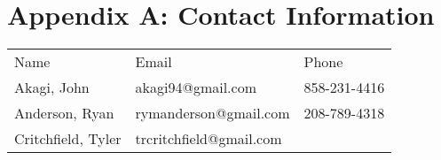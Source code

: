 \hypertarget{h.y4whnbg7qmd5}{\section{\texorpdfstring{{Appendix A:
Contact
Information}}{Appendix A: Contact Information}}\label{h.y4whnbg7qmd5}}

{}

\protect\hypertarget{t.2e2042f591def9aa75055b0ca485dff6c63ddda4}{}{}\protect\hypertarget{t.0}{}{}

\begin{longtable}[]{@{}lll@{}}
\toprule
\begin{minipage}[t]{0.30\columnwidth}\raggedright\strut
{Name}\strut
\end{minipage} & \begin{minipage}[t]{0.30\columnwidth}\raggedright\strut
{Email}\strut
\end{minipage} & \begin{minipage}[t]{0.30\columnwidth}\raggedright\strut
{Phone}\strut
\end{minipage}\tabularnewline
\begin{minipage}[t]{0.30\columnwidth}\raggedright\strut
{Akagi, John}\strut
\end{minipage} & \begin{minipage}[t]{0.30\columnwidth}\raggedright\strut
{akagi94@gmail.com}\strut
\end{minipage} & \begin{minipage}[t]{0.30\columnwidth}\raggedright\strut
{858-231-4416}\strut
\end{minipage}\tabularnewline
\begin{minipage}[t]{0.30\columnwidth}\raggedright\strut
{Anderson, Ryan}\strut
\end{minipage} & \begin{minipage}[t]{0.30\columnwidth}\raggedright\strut
{rymanderson@gmail.com}\strut
\end{minipage} & \begin{minipage}[t]{0.30\columnwidth}\raggedright\strut
{208-789-4318}\strut
\end{minipage}\tabularnewline
\begin{minipage}[t]{0.30\columnwidth}\raggedright\strut
{Critchfield, Tyler}\strut
\end{minipage} & \begin{minipage}[t]{0.30\columnwidth}\raggedright\strut
{trcritchfield@gmail.com}\strut
\end{minipage} & \begin{minipage}[t]{0.30\columnwidth}\raggedright\strut

\end{minipage}
\end{longtable}
